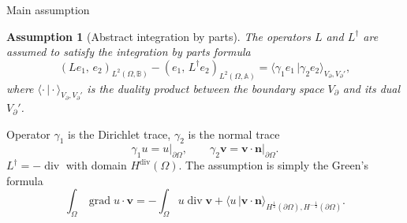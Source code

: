 \documentclass[aspectratio=169]{beamer}
\DeclareMathOperator*{\grad}{grad}
\renewcommand{\div}{\operatorname{div}}
\newcommand{\bbR}{\mathbb{R}}
\newcommand{\bbA}{\mathbb{A}}
\newcommand{\bbB}{\mathbb{B}}
\newcommand{\inner}[3][]{\ensuremath{( #2, \, #3 )_{#1}}}
\newcommand{\dualpr}[3][]{\ensuremath{\langle #2 \, \vert #3 \rangle_{#1}}}
\newtheorem{assumption}{Assumption}
\begin{document}
\begin{frame}{Main assumption}
\begin{assumption}[Abstract integration by parts]\label{Assumption-IBP}
	The operators $L$ and $L^\dag$ are assumed to satisfy the integration by parts formula
	\begin{equation*}\label{eq:intbyparts}
		\inner[L^2(\Omega, \bbB)]{L e_1}{e_2} - \inner[L^2(\Omega, \bbA)]{e_1}{L^\dag e_2} = \dualpr[V_\partial, V_\partial']{\gamma_1 e_1}{\gamma_2 e_2},
	\end{equation*}
	where $\dualpr[V_\partial, V_\partial']{\cdot}{\cdot}$ is the duality product between the boundary space $V_\partial$ and its dual $V_\partial'$.
\end{assumption}

\begin{tcolorbox}[nobeforeafter, colframe=theme,title=Example: {$L=\grad: L^2(\Omega) \rightarrow L^2(\Omega, \bbR^d), \; D(\grad)=H^1(\Omega)$}]%
	Operator $\gamma_1$ is the Dirichlet trace, $\gamma_2$ is the normal trace 
	\begin{equation*}
		\gamma_1 u= u\vert_{\partial\Omega}, \qquad \gamma_2 \bm{v}= \bm{v} \cdot \bm{n}\vert_{\partial\Omega}.
	\end{equation*}
$L^\dag = -\div$ with domain $H^{\div}(\Omega)$. The assumption is simply the Green's formula
\begin{equation*}
	\int_\Omega \grad u \cdot \bm{v} = - \int_\Omega u \div \bm{v} + \dualpr[H^{\frac{1}{2}}(\partial\Omega), H^{-\frac{1}{2}}(\partial\Omega)]{u}{\bm{v} \cdot \bm{n}}.
\end{equation*}
\end{tcolorbox} 

\end{frame}
\end{document}
